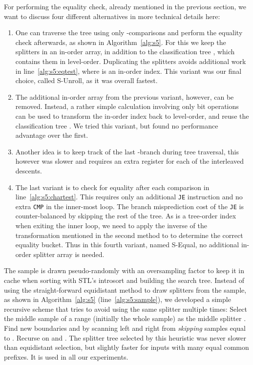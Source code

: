 \documentclass[a4paper]{myjournal}
\begin{document}
For performing the equality check, already mentioned in the previous section, we
want to discuss four different alternatives in more technical details here:
\begin{enumerate}
\item One can traverse the tree using only -comparisons and perform the
  equality check afterwards, as shown in Algorithm~\ref{alg:s5}. For this we
  keep the splitters  in an in-order array, in addition to the
  classification tree , which contains them in level-order. Duplicating the
  splitters avoids additional work in line~\ref{alg:s5:eqtest}, where  is an
  in-order index. This variant was our final choice, called S-Unroll, as it
  was overall fastest.

\item The additional in-order array from the previous variant, however, can be
  removed. Instead, a rather simple calculation involving only bit operations
  can be used to transform the in-order index  back to level-order, and reuse
  the classification tree . We tried this variant, but found no performance
  advantage over the first.

\item Another idea is to keep track of the last -branch during tree
  traversal, this however was slower and requires an extra register for each of
  the interleaved descents.

\item The last variant is to check for equality after each comparison in
  line~\ref{alg:s5:chartest}. This requires only an additional \texttt{JE}
  instruction and no extra \texttt{CMP} in the inner-most loop.  The branch
  misprediction cost of the \texttt{JE} is counter-balanced by skipping the rest
  of the tree.  As  is a tree-order index when exiting the inner loop, we
  need to apply the inverse of the transformation mentioned in the second method
  to  to determine the correct equality bucket.  Thus in this fourth variant,
  named S-Equal, no additional in-order splitter array is needed.

\end{enumerate}

The sample is drawn pseudo-randomly with an oversampling factor  to
keep it in cache when sorting with STL's introsort and building the search tree.
Instead of using the straight-forward equidistant method to draw splitters from
the sample, as shown in Algorithm~\ref{alg:s5} (line~\ref{alg:s5:sample}), we
developed a simple recursive scheme that tries to avoid using the same splitter
multiple times: Select the middle sample  of a range  (initially the
whole sample) as the middle splitter . Find new boundaries  and
 by scanning left and right from  \emph{skipping} samples equal to
. Recurse on  and .  The splitter tree selected by this
heuristic was never slower than equidistant selection, but slightly faster for
inputs with many equal common prefixes. It is used in all our experiments.
\end{document}
